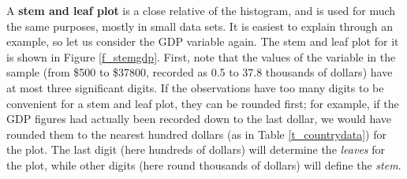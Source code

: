 A \textbf{stem and leaf plot} is a close relative of the histogram,
and is used for much the same purposes, mostly in small data sets. It
is easiest to explain through an example, so let us consider the GDP
variable again. The stem and leaf plot for it is shown in Figure
\ref{f_stemgdp}. First, note that the values of the variable in the
sample (from \$500 to \$37800, recorded as 0.5 to 37.8 thousands of
dollars) have at most three significant digits. If the
observations have too many digits to be convenient for a stem and leaf
plot, they can be rounded first; for example, if the GDP figures had
actually been recorded down to the last dollar, we would have rounded
them to the nearest hundred dollars (as in Table \ref{t_countrydata})
for the plot. The last digit (here hundreds of dollars) will determine
the \emph{leaves} for the plot, while other digits (here round
thousands of dollars) will define the \emph{stem}.

